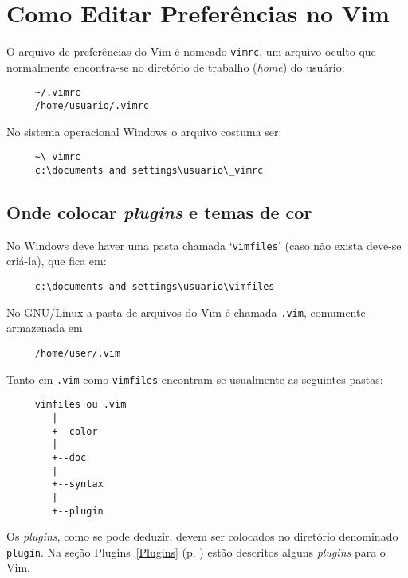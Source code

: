 
\chapter{Como Editar Preferências no Vim}\label{cha:Como editar preferências no Vim}

O arquivo de preferências do Vim é nomeado {\tt vimrc}, um arquivo oculto que
normalmente encontra-se no diretório de trabalho ({\em home}) do usuário:

\begin{verbatim}
     ~/.vimrc
     /home/usuario/.vimrc
\end{verbatim}

No sistema operacional Windows o arquivo costuma ser:

\begin{verbatim}
     ~\_vimrc
     c:\documents and settings\usuario\_vimrc
\end{verbatim}

\section{Onde colocar {\em plugins} e temas de cor}
\label{Onde colocar plugins e temas de cor}

No Windows deve haver uma pasta chamada `{\tt vimfiles}' (caso não exista
deve-se criá-la), que fica em:

\begin{verbatim}
     c:\documents and settings\usuario\vimfiles
\end{verbatim}

No GNU/Linux a pasta de arquivos do Vim é chamada {\tt .vim}, comumente
armazenada em

\begin{verbatim}
     /home/user/.vim
\end{verbatim}

Tanto em {\tt .vim} como {\tt vimfiles} encontram-se usualmente as seguintes
pastas:

\begin{verbatim}
     vimfiles ou .vim
        |
        +--color
        |
        +--doc
        |
        +--syntax
        |
        +--plugin
\end{verbatim}

Os {\em plugins}, como se pode deduzir, devem ser colocados no diretório
denominado {\tt plugin}. {\Large {}} Na seção Plugins~\ref{Plugins} (p.
\pageref{Plugins}) estão descritos alguns {\em plugins} para o Vim.

